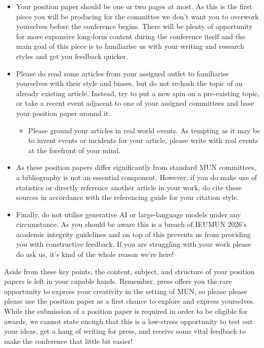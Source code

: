 \begin{itemize}
  \item Your position paper should be one or two pages at most. As this is the first piece you will be producing for the committee we don’t want you to overwork yourselves before the conference begins. There will be plenty of opportunity for more expansive long-form content during the conference itself and the main goal of this piece is to familiarise us with your writing and research styles and get you feedback quicker.
  \item Please do read some articles from your assigned outlet to familiarise yourselves with their style and biases, but do not re-hash the topic of an already existing article. Instead, try to put a new spin on a pre-existing topic, or take a recent event adjacent to one of your assigned committees and base your position paper around it.
  \begin{itemize}
    \item Please ground your articles in real world events. As tempting as it may be to invent events or incidents for your article, please write with real events at the forefront of your mind.
  \end{itemize}
  \item As these position papers differ significantly from standard MUN committees, a bibliography is not an essential component. However, if you do make use of statistics or directly reference another article in your work, do cite these sources in accordance with the referencing guide for your citation style.
  \item Finally, do not utilise generative AI or large-language models under any circumstance. As you should be aware this is a breach of IEUMUN 2026’s academic integrity guidelines and on top of this prevents us from providing you with constructive feedback. If you are struggling with your work please do ask us, it’s kind of the whole reason we’re here!
\end{itemize}

Aside from these key points, the content, subject, and structure of your position papers is left in your capable hands. Remember, press offers you the rare opportunity to express your creativity in the setting of MUN, so please please please use the position paper as a first chance to explore and express yourselves. While the submission of a position paper is required in order to be eligible for awards, we cannot state enough that this is a low-stress opportunity to test out your ideas, get a hang of writing for press, and receive some vital feedback to make the conference that little bit easier!
